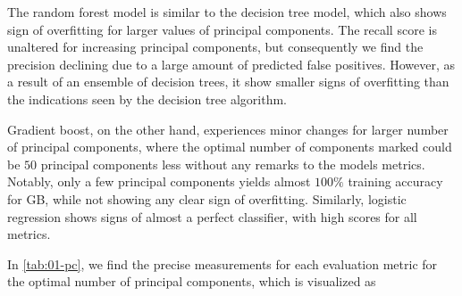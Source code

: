 The random forest model is similar to the decision tree model, which also shows sign of overfitting for larger values of principal components. The recall score is unaltered for increasing principal components, but consequently we find the precision declining due to a large amount of predicted false positives.  However, as a result of an ensemble of decision trees, it show smaller signs of overfitting than the indications seen by the decision tree algorithm.

Gradient boost, on the other hand, experiences minor changes for larger number of principal components, where the optimal number of components marked could be $50$ principal components less without any remarks to the models metrics. Notably, only a few principal components yields almost $100\%$ training accuracy for GB, while not showing any clear sign of overfitting. Similarly, logistic regression shows signs of almost a perfect classifier, with high scores for all metrics.

In \autoref{tab:01-pc}, we find the precise measurements for each evaluation metric for the optimal number of principal components, which is visualized as

\clearpage

